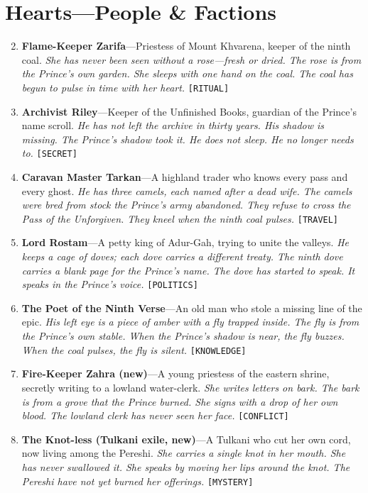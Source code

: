 \section*{Hearts---People \& Factions}
\label{sec:pereshi-people}
\begin{enumerate}
\setcounter{enumi}{1}
\item \textbf{Flame-Keeper Zarifa}---Priestess of Mount Khvarena, keeper of the ninth coal.
  \hfill \textit{She has never been seen without a rose---fresh or dried. The rose is from the Prince's own garden. She sleeps with one hand on the coal. The coal has begun to pulse in time with her heart.} \texttt{[RITUAL]}
\item \textbf{Archivist Riley}---Keeper of the Unfinished Books, guardian of the Prince's name scroll.
  \hfill \textit{He has not left the archive in thirty years. His shadow is missing. The Prince's shadow took it. He does not sleep. He no longer needs to.} \texttt{[SECRET]}
\item \textbf{Caravan Master Tarkan}---A highland trader who knows every pass and every ghost.
  \hfill \textit{He has three camels, each named after a dead wife. The camels were bred from stock the Prince's army abandoned. They refuse to cross the Pass of the Unforgiven. They kneel when the ninth coal pulses.} \texttt{[TRAVEL]}
\item \textbf{Lord Rostam}---A petty king of Adur-Gah, trying to unite the valleys.
  \hfill \textit{He keeps a cage of doves; each dove carries a different treaty. The ninth dove carries a blank page for the Prince's name. The dove has started to speak. It speaks in the Prince's voice.} \texttt{[POLITICS]}
\item \textbf{The Poet of the Ninth Verse}---An old man who stole a missing line of the epic.
  \hfill \textit{His left eye is a piece of amber with a fly trapped inside. The fly is from the Prince's own stable. When the Prince's shadow is near, the fly buzzes. When the coal pulses, the fly is silent.} \texttt{[KNOWLEDGE]}
\item \textbf{Fire-Keeper Zahra (new)}---A young priestess of the eastern shrine, secretly writing to a lowland water-clerk.
  \hfill \textit{She writes letters on bark. The bark is from a grove that the Prince burned. She signs with a drop of her own blood. The lowland clerk has never seen her face.} \texttt{[CONFLICT]}
\item \textbf{The Knot-less (Tulkani exile, new)}---A Tulkani who cut her own cord, now living among the Pereshi.
  \hfill \textit{She carries a single knot in her mouth. She has never swallowed it. She speaks by moving her lips around the knot. The Pereshi have not yet burned her offerings.} \texttt{[MYSTERY]}

\end{enumerate}
